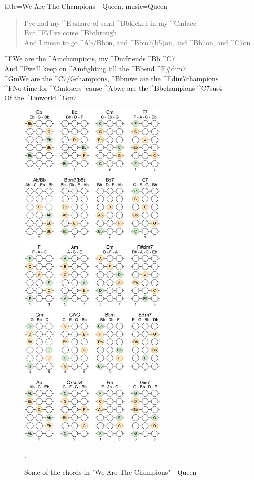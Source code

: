 \begin{song}[align-chords=l]{title={We Are The Champions - Queen}, music={Queen}} \label{song:we_are_the_champions_queen}
	\begin{verse}
		I've had my ^{Eb}share of sand ^{Bb}kicked in my ^{Cm}face \\
		But ^{F7}I've come ^{Bb}through \\
		And I mean to go ^{Ab/Bb}on, and ^{Bbm7(b5)}on, and ^{Bb7}on, and ^{C7}on \\
	\end{verse}
	
	\begin{chorus}
		^{F}We are the ^{Am}champions, my ^{Dm}friends ^{Bb} ^{C7} \\
		And ^{F}we'll keep on ^{Am}fighting till the ^{Bb}end ^{F#dim7} \\
		^{Gm}We are the ^{C7/G}champions, ^{Bbm}we are the ^{Edim7}champions \\
		^{F}No time for ^{Gm}losers 'cause ^{Ab}we are the ^{Bb}champions ^{C7sus4} \\
		Of the ^{Fm}world ^{Gm7}
 	\end{chorus}
\end{song}

\newpage

\begin{figure}[h]
	\centering
	\includegraphics[width=0.65\textwidth]{../../Images/WeAreTheChampionsQueenKeyChangeChords.png}
	\caption{Some of the chords in "We Are The Champions" - Queen}.
	\label{fig:queen_we_are_the_champions_key_change_chords}
\end{figure}


\newpage